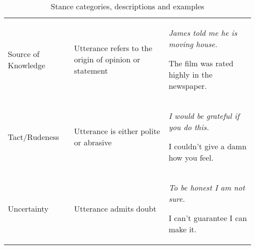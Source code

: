 \documentclass[Dissertation.tex]{subfiles}
\begin{document}
{\begin{table}[]
\begin{tabularx}{\textwidth}{>{\raggedright}p{3cm} >{\raggedright}p{5.5cm} X}
			Source of Knowledge    & Utterance refers to the origin of opinion or statement & \itshape James told me he is moving house.\par The film was rated highly in the newspaper.                      \\
			Tact/Rudeness          & Utterance is either  polite or abrasive           & \itshape I would be grateful if you do this.\par I couldn’t give a damn how you feel.                           \\
			Uncertainty            & Utterance admits doubt                                 & \itshape To be honest I am not sure.\par I can’t guarantee I can make it.                                       \\ \bottomrule
		\end{tabularx}
		\caption{Stance categories, descriptions and examples}
		\label{tab:stanceExamples}
\end{table}}
\end{document}
